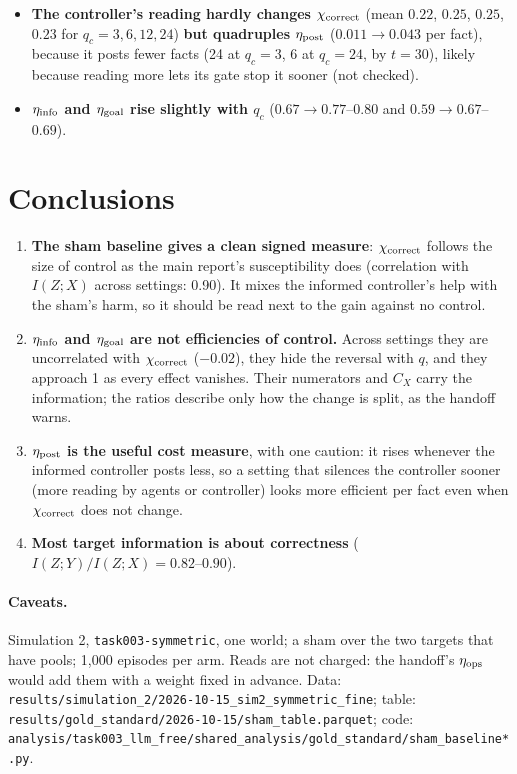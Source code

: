 \documentclass[10pt,a4paper]{article}
\begin{document}
\begin{itemize}\itemsep1pt
\item \textbf{The controller's reading hardly changes $\chi_{\rm correct}$} (mean $0.22$, $0.25$, $0.25$, $0.23$ for
  $q_c = 3, 6, 12, 24$) \textbf{but quadruples $\eta_{\rm post}$} ($0.011 \to 0.043$ per fact), because it posts fewer facts (24 at $q_c = 3$, 6 at
  $q_c = 24$, by $t = 30$), likely because reading more lets its gate stop it sooner (not checked).
\item \textbf{$\eta_{\rm info}$ and $\eta_{\rm goal}$ rise slightly with $q_c$} ($0.67 \to 0.77$--$0.80$ and
  $0.59 \to 0.67$--$0.69$).
\end{itemize}

\section{Conclusions}

\begin{enumerate}\itemsep2pt
\item \textbf{The sham baseline gives a clean signed measure}: $\chi_{\rm correct}$ follows the size of control as the
  main report's susceptibility does (correlation with $I(Z;X)$ across settings: 0.90). It mixes the informed
  controller's help with the sham's harm, so it should be read next to the gain against no control.
\item \textbf{$\eta_{\rm info}$ and $\eta_{\rm goal}$ are not efficiencies of control.} Across settings they are
  uncorrelated with $\chi_{\rm correct}$ ($-0.02$), they hide the reversal with $q$, and they approach 1 as every
  effect vanishes. Their numerators and $C_X$ carry the information; the ratios describe only how the change is
  split, as the handoff warns.
\item \textbf{$\eta_{\rm post}$ is the useful cost measure}, with one caution: it rises whenever the informed
  controller posts less, so a setting that silences the controller sooner (more reading by agents or controller)
  looks more efficient per fact even when $\chi_{\rm correct}$ does not change.
\item \textbf{Most target information is about correctness} ($I(Z;Y)/I(Z;X) = 0.82$--$0.90$).
\end{enumerate}

\paragraph{Caveats.} Simulation 2, \texttt{task003-symmetric}, one world; a sham over the two targets that have
pools; 1{,}000 episodes per arm. Reads are not charged: the handoff's $\eta_{\rm ops}$ would add them with a weight
fixed in advance. Data: \texttt{results/simulation\_2/2026-10-15\_sim2\_symmetric\_fine}; table:
\texttt{results/gold\_standard/2026-10-15/sham\_table.parquet}; code: \texttt{analysis/task003\_llm\_free/shared\_analysis/gold\_standard/sham\_baseline*.py}.
\end{document}
